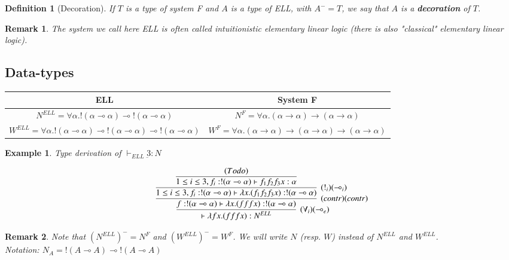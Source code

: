 \documentclass[a4paper,10pt]{article}
\newcommand{\impl}{\rightarrow}	%
\newcommand{\limpl}{\multimap}  %
\newtheorem{definition}{Definition}
\newtheorem{ex}{Example}
\newtheorem{rmk}{Remark}
\begin{document}
\begin{definition}[Decoration]
If $T$ is a type of system F and $A$ is a type of ELL, with $A^{-}=T$, we say that $A$ is a \textbf{decoration} of $T$.
\end{definition}

\begin{rmk}
The system we call here ELL is often called intuitionistic elementary linear logic (there is also "classical" elementary linear logic).
\end{rmk}



\subsection{Data-types}

\begin{center}
\begin{tabular}{|c|c|}
\hline
ELL & System F \\
\hline
$N^{ELL} = \forall \alpha. !(\alpha \limpl \alpha) \limpl !(\alpha \limpl \alpha)$ & $N^{F} = \forall \alpha. (\alpha \impl \alpha) \impl (\alpha \impl \alpha)$\\
\hline
$W^{ELL} = \forall \alpha. !(\alpha \limpl \alpha) \limpl !(\alpha \limpl \alpha) \limpl !(\alpha \limpl \alpha)$ & $W^{F} = \forall \alpha. (\alpha \impl \alpha) \impl (\alpha \impl \alpha) \impl (\alpha \impl \alpha)$\\
\hline
\end{tabular}
\end{center}


\begin{ex}{Type derivation of $\vdash_{ELL} \underbar{3}:N$}

$$ \infer[(\forall_i) (\limpl_e)]{\vdash \lambda f x.(f f f x) : N^{ELL}}
	{
	\infer[(contr) (contr)]{f: !(\alpha \limpl \alpha) \vdash \lambda x.(f f f x) : !(\alpha \limpl \alpha)}
		{
		\infer[(!_i) (\limpl_i)]{1 \leq i \leq 3, f_i: !(\alpha \limpl \alpha) \vdash \lambda x. (f_1 f_2 f_3 x) : !(\alpha \limpl \alpha)}
			{
				\infer{1 \leq i \leq 3, f_i: !(\alpha \limpl \alpha) \vdash f_1 f_2 f_3 x : \alpha}
				{(To do)}
			}
		}
	}$$
\end{ex}

\begin{rmk}
Note that $(N^{ELL})^{-} = N^{F}$ and $(W^{ELL})^{-} = W^{F}$. We will write $N$ (resp. $W$) instead of $N^{ELL}$ and $W^{ELL}$.\\
Notation: $N_A = !(A \limpl A) \limpl !(A \limpl A)$
\end{rmk}
\end{document}
